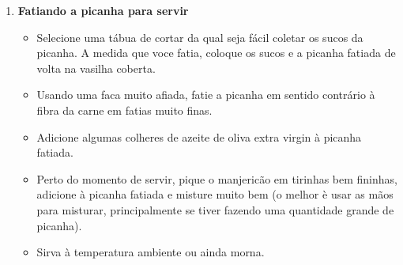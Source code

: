\documentclass [11pt, letterpaper] {article}
\begin{document}
\begin{description}
\begin{enumerate}
\begin{itemize}
	\end{itemize}
	\item {\bf Fatiando a picanha para servir}
	\begin{itemize}
        		\item Selecione uma t\'abua de cortar da qual seja f\'acil coletar os sucos da picanha. A medida que voce fatia, coloque os sucos e a picanha fatiada de volta na vasilha coberta.
		\item Usando uma faca muito afiada, fatie a picanha em sentido contr\'ario \`a fibra da carne em fatias muito finas. 
		\item Adicione algumas colheres de azeite de oliva extra virgin \`a picanha fatiada.
		\item Perto do momento de servir, pique o manjeric\~ao em tirinhas bem fininhas, adicione \`a picanha fatiada e misture muito bem (o melhor \`e usar as m\~aos para misturar, principalmente se tiver fazendo uma quantidade grande de picanha). 
		\item Sirva \`a temperatura ambiente ou ainda morna.
	\end{itemize}
     	\end{enumerate}         
\end{description}
\end{document}
